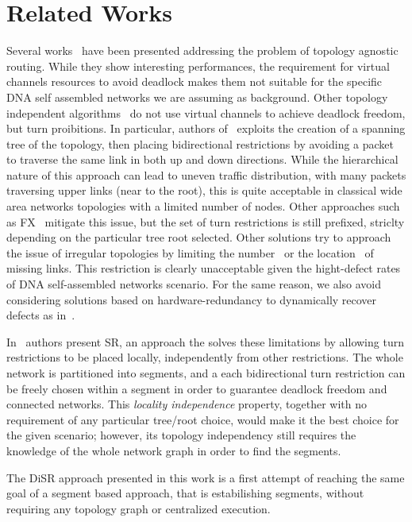 \section{Related Works}
\label{sec:related_works}
Several works~\cite{sancho2002, skeie2002, skeie2004, koibuchi2003} have been presented addressing the problem of topology
agnostic routing. While they show interesting
performances, the requirement for virtual channels resources 
to avoid deadlock makes them not suitable for the specific DNA self
assembled networks we are assuming as background.
Other topology independent algorithms~\cite{schroeder1991, koibuchi2001, cherkasova1996} do not use virtual channels to
achieve deadlock freedom, but turn proibitions. 
In particular, authors of~\cite{Patwardhan05evaluatingthe} exploits the creation of a spanning tree of the
topology, then placing bidirectional restrictions by avoiding a packet
to traverse the same link in both up and down directions.
While the hierarchical nature of this approach can lead to uneven traffic
distribution, with many packets traversing upper links (near to the
root), this is quite acceptable in classical wide area networks
topologies with a limited number of nodes. Other approaches such as
FX~\cite{sancho2000} mitigate this
issue, but the set of turn restrictions is still prefixed,
striclty depending on the particular tree root selected. 
Other solutions try to approach the issue of irregular
topologies by limiting the number~\cite{dally1994, duato1997, gomez2004, koibuchi2008} or the
location~\cite{zhang2008, sui2000, flich2008, liu2011} of missing links. This
restriction is clearly unacceptable given the hight-defect rates of
DNA self-assembled networks scenario. For the same reason, we also
avoid considering solutions based on hardware-redundancy to
dynamically recover defects as in~\cite{constantinides2006, kohler2010, kim2006, park2006}. 

In~\cite{mejia_ipdps06} authors present SR, an approach the solves these
limitations by allowing turn restrictions to be placed locally,
independently from other restrictions. The whole network is
partitioned into segments, and a each bidirectional turn
restriction can be freely chosen within a segment in order to guarantee
deadlock freedom and connected networks. This \emph{locality
independence} property, together with no requirement of any particular tree/root
choice, would make it the best choice for the given scenario;
however, its topology independency still requires the knowledge of the
whole network graph in order to find the segments. 

The DiSR approach presented in this work is a first attempt of
reaching the same goal of a segment based approach, that is
estabilishing segments, without requiring any topology graph or
centralized execution.



